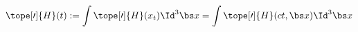 \begin{equation}	\label{12.58new}
\tope[\prime]{H}(t)
:=
\int \tope[\prime]{H}(x_t) \Id^3\bs x
=
\int \tope[\prime]{H}(ct,\bs x) \Id^3\bs x
	\end{equation}

